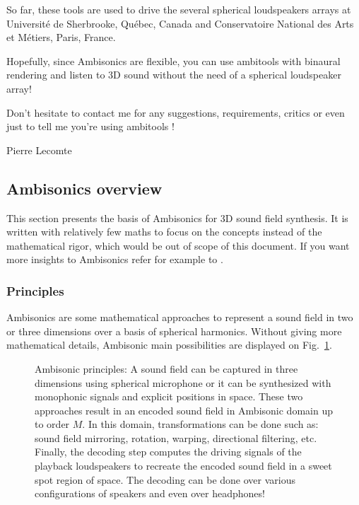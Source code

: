 \documentclass[10pt,a4paper]{article}
\begin{document}
So far, these tools are used to drive the several spherical loudspeakers arrays at Université de Sherbrooke, Québec, Canada and Conservatoire National des Arts et Métiers, Paris, France.

Hopefully, since Ambisonics are flexible, you can use ambitools with binaural rendering and listen to 3D sound without the need of a spherical loudspeaker array!

Don't hesitate to contact me for any suggestions, requirements, critics or even just to tell me you're using ambitools !
\begin{flushright}
Pierre Lecomte
\end{flushright}

\subsection{Ambisonics overview}
This section presents the basis of Ambisonics for 3D sound field synthesis. It is written with relatively few maths to focus on the concepts instead of the mathematical rigor, which would be out of scope of this document. If you want more insights to Ambisonics refer for example to \cite{daniel2000representation,poletti2005three,ahrens2012analytic}.

\subsubsection{Principles}
Ambisonics are some mathematical approaches to represent a sound field in two or three dimensions over a basis of spherical harmonics. Without giving more mathematical details, Ambisonic main possibilities are displayed on Fig.~\ref{fig:ambisonics}.
\begin{figure}[!ht]
	\centering
	\def\svgwidth{\columnwidth}
	
	\caption{Ambisonic principles: A sound field can be captured in three dimensions using spherical microphone or it can be synthesized with monophonic signals and explicit positions in space. These two approaches result in an encoded sound field in Ambisonic domain up to order $M$. In this domain, transformations can be done such as: sound field mirroring, rotation, warping, directional filtering, etc. Finally, the decoding step computes the driving signals of the playback loudspeakers to recreate the encoded sound field in a sweet spot region of space. The decoding can be done over various configurations of speakers and even over headphones!}
	\label{fig:ambisonics}
\end{figure}
\end{document}
